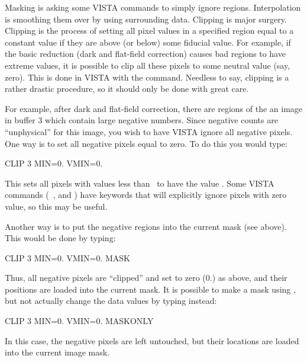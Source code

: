 
Masking is asking some VISTA commands to simply ignore regions.  Interpolation
is smoothing them over by using surrounding data.  Clipping is major surgery.
Clipping is the process of setting all pixel values in a specified region
equal to a constant value if they are above (or below) some fiducial value.
For example, if the basic reduction (dark and flat-field correction) causes
bad regions to have extreme values, it is possible to clip all these pixels to
some neutral value (say, zero).  This is done in VISTA with the 
command.  Needless to say, clipping is a rather drastic procedure, so it
should only be done with great care. 

For example, after dark and flat-field correction, there are regions of
the an image in buffer 3 which contain large negative numbers.  Since negative
counts are ``unphysical'' for this image, you wish to have VISTA ignore all
negative pixels.  One way is to set all negative pixels equal to zero.  To do
this you would type: 
\begin{command}
      \item CLIP 3 MIN=0. VMIN=0.
\end{command}
This sets all pixels with values less than \ to have the value
.  Some VISTA commands (\eg\ , and ) have
keywords that will explicitly ignore pixels with zero value, so this may be
useful. 

Another way is to put the negative regions into the current mask (see above).
This would be done by typing: 
\begin{command}
      \item CLIP 3 MIN=0. VMIN=0. MASK
\end{command}
Thus, all negative pixels are ``clipped'' and set to zero (0.) as above, and
their positions are loaded into the current mask.  It is possible to make a
mask using , but not actually change the data values by typing
instead: 
\begin{command}
      \item CLIP 3 MIN=0. VMIN=0. MASKONLY
\end{command}
In this case, the negative pixels are left untouched, but their locations are
loaded into the current image mask. 

